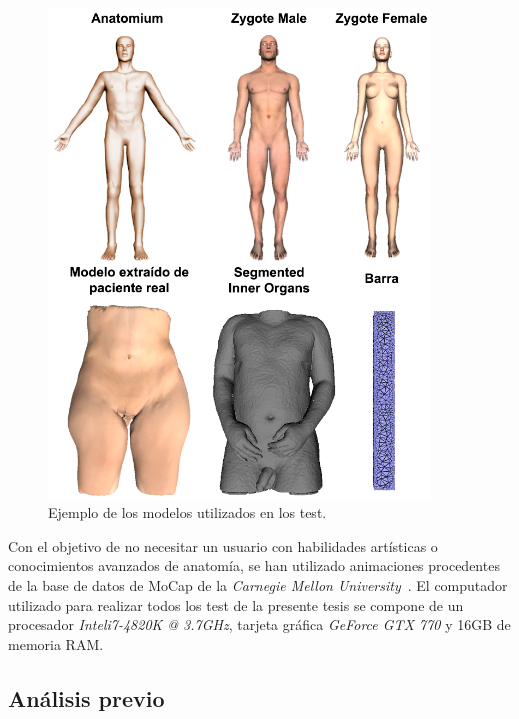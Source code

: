 \begin{figure}[h]%
  \centering
  \includegraphics[width=0.90\textwidth]{IMG/modelos}
    \caption{Ejemplo de los modelos utilizados en los test.}
    \label{fig:models}
\end{figure}


Con el objetivo de no necesitar un usuario con habilidades artísticas o conocimientos avanzados de anatomía, se han utilizado animaciones procedentes de la base de datos de \ac{MoCap} de la \emph{Carnegie Mellon University}~\cite{CMUMCD}. El computador utilizado para realizar todos los test de la presente tesis se compone de un procesador \emph{Intel\textregistered i7-4820K @ 3.7GHz}, tarjeta gráfica \emph{GeForce GTX 770} y 16GB de memoria \acs{RAM}.
\clearpage

\subsection{Análisis previo}
\label{sec:ana_prev}


